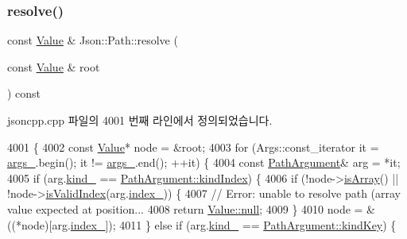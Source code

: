 \subsubsection{\texorpdfstring{resolve()}{resolve()}\hspace{0.1cm}{\footnotesize\ttfamily [1/2]}}
{\footnotesize\ttfamily const \hyperlink{class_json_1_1_value}{Value} \& Json\+::\+Path\+::resolve (\begin{DoxyParamCaption}\item[{const \hyperlink{class_json_1_1_value}{Value} \&}]{root }\end{DoxyParamCaption}) const}



jsoncpp.\+cpp 파일의 4001 번째 라인에서 정의되었습니다.


\begin{DoxyCode}
4001                                                   \{
4002   \textcolor{keyword}{const} \hyperlink{class_json_1_1_value}{Value}* node = &root;
4003   \textcolor{keywordflow}{for} (Args::const\_iterator it = \hyperlink{class_json_1_1_path_af33d0de7ee9f99d3e361bdf504dc2bc7}{args\_}.begin(); it != \hyperlink{class_json_1_1_path_af33d0de7ee9f99d3e361bdf504dc2bc7}{args\_}.end(); ++it) \{
4004     \textcolor{keyword}{const} \hyperlink{class_json_1_1_path_argument}{PathArgument}& arg = *it;
4005     \textcolor{keywordflow}{if} (arg.\hyperlink{class_json_1_1_path_argument_ad4bc4b544b155a3d9c7788572ecf991b}{kind\_} == \hyperlink{class_json_1_1_path_argument_a2420bbad778573c147e578701b84d9b9ae5a976b898111903334cb131f5e03dc4}{PathArgument::kindIndex}) \{
4006       \textcolor{keywordflow}{if} (!node->\hyperlink{class_json_1_1_value_a1627eb9d6568d6d0252fa8bb711c0a59}{isArray}() || !node->\hyperlink{class_json_1_1_value_ac2928f174a6e081c1500c28c2d61ee93}{isValidIndex}(arg.\hyperlink{class_json_1_1_path_argument_afd5857d1b6bfaae6961333bdae7bd5ec}{index\_})) \{
4007         \textcolor{comment}{// Error: unable to resolve path (array value expected at position...}
4008         \textcolor{keywordflow}{return} \hyperlink{class_json_1_1_value_a21ddb05b92c60c7548e928bf371e7d45}{Value::null};
4009       \}
4010       node = &((*node)[arg.\hyperlink{class_json_1_1_path_argument_afd5857d1b6bfaae6961333bdae7bd5ec}{index\_}]);
4011     \} \textcolor{keywordflow}{else} \textcolor{keywordflow}{if} (arg.\hyperlink{class_json_1_1_path_argument_ad4bc4b544b155a3d9c7788572ecf991b}{kind\_} == \hyperlink{class_json_1_1_path_argument_a2420bbad778573c147e578701b84d9b9a74f5968d06c01701b7a46092c33ba7d1}{PathArgument::kindKey}) \{

\end{DoxyCode}
